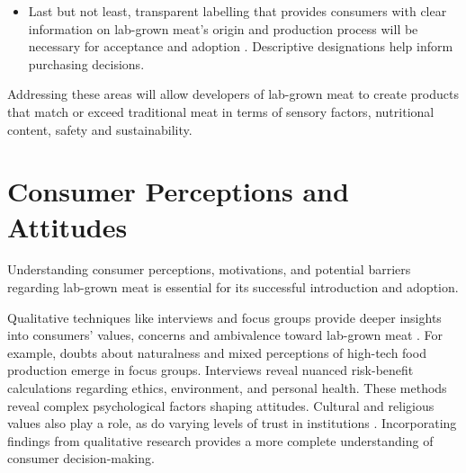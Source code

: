 \documentclass[10pt]{article}
\begin{document}
\begin{sloppypar}
\begin{itemize}
    \item Last but not least, transparent labelling that provides consumers with clear information on lab-grown meat’s origin and production process will be necessary for acceptance and adoption \citep{failla_evaluation_2023}. Descriptive designations help inform purchasing decisions.
  \end{itemize}
  Addressing these areas will allow developers of lab-grown meat to create products that match or exceed traditional meat in terms of sensory factors, nutritional content, safety and sustainability.

  \section{Consumer Perceptions and Attitudes}
  \label{sec:consumer-perceptions-and-attitudes}

  Understanding consumer perceptions, motivations, and potential barriers regarding lab-grown meat is essential for its successful introduction and adoption.

  Qualitative techniques like interviews and focus groups provide deeper insights into consumers’ values, concerns and ambivalence toward lab-grown meat \citep{laestadius_is_2015}. For example, doubts about naturalness and mixed perceptions of high-tech food production emerge in focus groups. Interviews reveal nuanced risk-benefit calculations regarding ethics, environment, and personal health. These methods reveal complex psychological factors shaping attitudes. Cultural and religious values also play a role, as do varying levels of trust in institutions \citep{al-kwifi_dynamics_2019}. Incorporating findings from qualitative research provides a more complete understanding of consumer decision-making.


\end{sloppypar}
\end{document}
